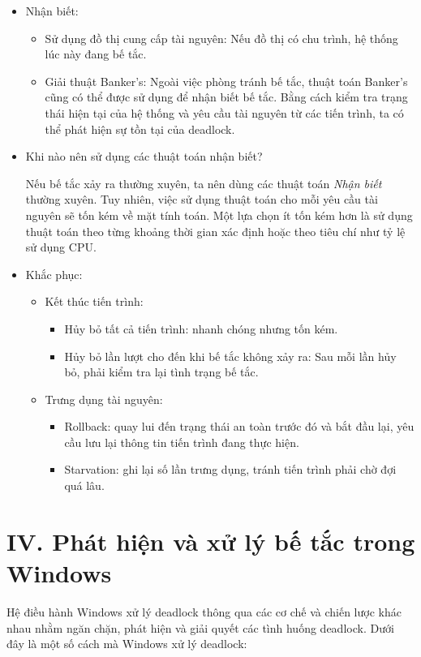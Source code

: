 \documentclass[12pt]{report}
\begin{document}
\begin{itemize}
	\item Nhận biết:
	      \begin{itemize}
	      	\item Sử dụng đồ thị cung cấp tài nguyên: Nếu đồ thị có chu trình, hệ thống lúc này đang bế tắc.
	      	\item Giải thuật Banker's: Ngoài việc phòng tránh bế tắc, thuật toán Banker's cũng có thể được sử dụng để nhận biết bế tắc. Bằng cách kiểm tra trạng thái hiện tại của hệ thống và yêu cầu tài nguyên từ các tiến trình, ta có thể phát hiện sự tồn tại của deadlock.
	      \end{itemize}
	\item Khi nào nên sử dụng các thuật toán nhận biết?
	          
	      Nếu bế tắc xảy ra thường xuyên, ta nên dùng các thuật toán \textit{Nhận biết} thường xuyên. Tuy nhiên, việc sử dụng thuật toán cho mỗi yêu cầu tài nguyên sẽ tốn kém về mặt tính toán. Một lựa chọn ít tốn kém hơn là sử dụng thuật toán theo từng khoảng thời gian xác định hoặc theo tiêu chí như tỷ lệ sử dụng CPU.
	\item Khắc phục:
	      \begin{itemize}
	      	\item Kết thúc tiến trình:
	      	      \begin{itemize}
	      	      	\item Hủy bỏ tất cả tiến trình: nhanh chóng nhưng tốn kém.
	      	      	\item Hủy bỏ lần lượt cho đến khi bế tắc không xảy ra: Sau mỗi lần hủy bỏ, phải kiểm tra lại tình trạng bế tắc.
	      	      \end{itemize}
	      	\item Trưng dụng tài nguyên:
	      	      \begin{itemize}
	      	      	\item Rollback: quay lui đến trạng thái an toàn trước đó và bắt đầu lại, yêu cầu lưu lại thông tin tiến trình đang thực hiện.
	      	      	\item Starvation: ghi lại số lần trưng dụng, tránh tiến trình phải chờ đợi quá lâu.
	      	      \end{itemize}
	      \end{itemize}
\end{itemize}

\section*{IV. Phát hiện và xử lý bế tắc trong Windows}
Hệ điều hành Windows xử lý deadlock thông qua các cơ chế và chiến lược khác nhau nhằm ngăn chặn, phát hiện và giải quyết các tình huống deadlock. Dưới đây là một số cách mà Windows xử lý deadlock:
\end{document}
